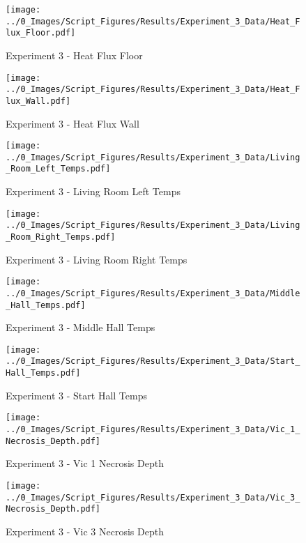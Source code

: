 	\clearpage

	\begin{figure}[H]
		\centering
		\texttt{[image: ../0\_Images/Script\_Figures/Results/Experiment\_3\_Data/Heat\_Flux\_Floor.pdf]}
		\caption[]{Experiment 3 - Heat Flux Floor}
	\end{figure}
 

	\begin{figure}[H]
		\centering
		\texttt{[image: ../0\_Images/Script\_Figures/Results/Experiment\_3\_Data/Heat\_Flux\_Wall.pdf]}
		\caption[]{Experiment 3 - Heat Flux Wall}
	\end{figure}
 
	\clearpage

	\begin{figure}[H]
		\centering
		\texttt{[image: ../0\_Images/Script\_Figures/Results/Experiment\_3\_Data/Living\_Room\_Left\_Temps.pdf]}
		\caption[]{Experiment 3 - Living Room Left Temps}
	\end{figure}
 

	\begin{figure}[H]
		\centering
		\texttt{[image: ../0\_Images/Script\_Figures/Results/Experiment\_3\_Data/Living\_Room\_Right\_Temps.pdf]}
		\caption[]{Experiment 3 - Living Room Right Temps}
	\end{figure}
 
	\clearpage

	\begin{figure}[H]
		\centering
		\texttt{[image: ../0\_Images/Script\_Figures/Results/Experiment\_3\_Data/Middle\_Hall\_Temps.pdf]}
		\caption[]{Experiment 3 - Middle Hall Temps}
	\end{figure}
 

	\begin{figure}[H]
		\centering
		\texttt{[image: ../0\_Images/Script\_Figures/Results/Experiment\_3\_Data/Start\_Hall\_Temps.pdf]}
		\caption[]{Experiment 3 - Start Hall Temps}
	\end{figure}
 
	\clearpage

	\begin{figure}[H]
		\centering
		\texttt{[image: ../0\_Images/Script\_Figures/Results/Experiment\_3\_Data/Vic\_1\_Necrosis\_Depth.pdf]}
		\caption[]{Experiment 3 - Vic 1 Necrosis Depth}
	\end{figure}
 

	\begin{figure}[H]
		\centering
		\texttt{[image: ../0\_Images/Script\_Figures/Results/Experiment\_3\_Data/Vic\_3\_Necrosis\_Depth.pdf]}
		\caption[]{Experiment 3 - Vic 3 Necrosis Depth}
	\end{figure}
 
